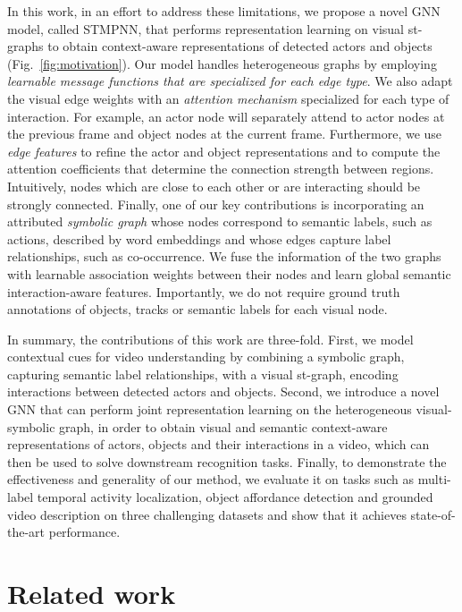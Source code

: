 \documentclass[runningheads]{llncs}
\begin{document}
In this work, in an effort to address these limitations, we propose a novel 
\ac{GNN}  model, called \ac{STMPNN}, that performs representation learning on 
visual st-graphs to obtain context-aware representations of detected actors 
and objects (Fig.~\ref{fig:motivation}). Our model handles heterogeneous graphs by employing \emph{learnable 
message functions that are specialized for each edge type}.
We also adapt the visual edge weights with an \emph{attention mechanism} 
specialized for each type of interaction. For example, an actor node will 
separately attend to actor nodes at the previous frame and object 
nodes at the current frame. Furthermore, we use \emph{edge features} to refine the actor and object representations and to compute the attention coefficients that determine the connection strength between regions. Intuitively, nodes which are close to 
each other or are interacting should be strongly connected. Finally, one of 
our key contributions is incorporating an attributed \emph{symbolic 
graph} whose nodes correspond to semantic labels, such as actions, described 
by word embeddings and whose edges capture label relationships, such as co-occurrence. We fuse the information of the two graphs with 
learnable association weights between their nodes and learn global semantic interaction-aware features. Importantly, we do not require 
ground truth annotations of objects, tracks or semantic labels for each 
visual node. 

In summary, the contributions of this work are three-fold. 
First, we model contextual cues for video understanding by combining a 
symbolic graph, capturing semantic label relationships, with a visual st-graph, encoding interactions between detected actors and objects. 
Second, we introduce a novel \ac{GNN} that can perform joint representation 
learning on the heterogeneous visual-symbolic graph, in order to obtain visual and 
semantic context-aware representations of actors, objects and their interactions in a video, which can then be used to solve downstream 
recognition tasks. 
Finally, to demonstrate the effectiveness and generality of our method, we
evaluate it on tasks such as multi-label temporal activity localization, 
object affordance detection and grounded video description on three 
challenging datasets and show that it achieves state-of-the-art performance.
 \section{Related work}
\label{sec:related_work}
\end{document}
